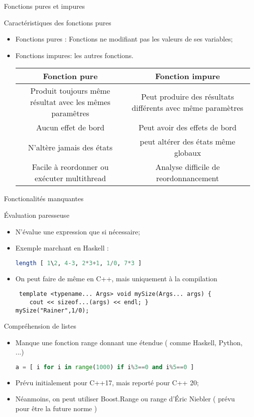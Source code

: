 \documentclass[handout,10pt]{beamer}
\begin{document}
\begin{frame}[fragile]{Fonctions pures et impures}
\tiny
\begin{block}{Caractéristiques des fonctions pures}
\begin{itemize}
\item Fonctions pures : Fonctions ne modifiant pas les valeurs de ses variables;
\item Fonctions impures: les autres fonctions.
\begin{tabular}{|c|c|}\hline
\rowcolor{blue}\textbf{Fonction pure} & \textbf{Fonction impure} \\ \hline
\rowcolor{cyan}Produit toujours même résultat avec les mêmes paramêtres & Peut produire des résultats différents avec même paramètres \\
\rowcolor{white}Aucun  effet de bord & Peut avoir des effets de bord \\
\rowcolor{cyan}N'altère jamais des états & peut altérer des états même globaux\\
\rowcolor{white}Facile à reordonner ou exécuter multithread & Analyse difficile de reordonnancement \\ \hline
\end{tabular}
\end{itemize}
\end{block}
\end{frame}

\begin{frame}[fragile]{Fonctionalités manquantes}
\tiny
\begin{block}{Évaluation paresseuse}
\begin{itemize}
\item N'évalue une expression que si nécessaire;
\item Exemple marchant en Haskell : 
\begin{lstlisting}[language=haskell]
length [ 1\2, 4-3, 2*3+1, 1/0, 7*3 ]
\end{lstlisting}
\item On peut faire de même en C++, mais uniquement à la compilation
\begin{lstlisting}
 template <typename... Args> void mySize(Args... args) { 
    cout << sizeof...(args) << endl; } 
mySize("Rainer",1/0);  \end{lstlisting}
\end{itemize}
\end{block}
\begin{block}{Compréhension de listes}
\begin{itemize}
\item Manque une fonction range donnant une étendue ( comme Haskell, Python, ...)
\begin{lstlisting}[language=python]
a = [ i for i in range(1000) if i%3==0 and i%5==0 ]
\end{lstlisting}
\item Prévu initialement pour C++17, mais reporté pour C++ 20;
\item Néanmoins, on peut utiliser Boost.Range ou range d'\'Eric Niebler ( prévu pour être la future norme )
\end{itemize}
\end{block}
\end{frame}
\end{document}
